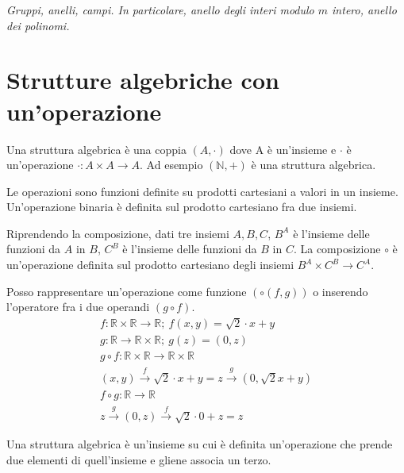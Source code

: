 
\begin{center}
\indent
\textit{Gruppi, anelli, campi. In particolare, anello degli interi modulo $m$ intero, anello dei polinomi.}
\end{center}

\section{Strutture algebriche con un'operazione}

Una struttura algebrica \`e una coppia $(A, \cdot)$ dove A \`e un'insieme e $\cdot$ \`e un'operazione $\cdot : A \times A \to A$. Ad esempio $(\mathbb{N}, +)$ \`e una struttura algebrica.

Le operazioni sono funzioni definite su prodotti cartesiani a valori in un insieme. Un'operazione binaria \`e definita sul prodotto cartesiano fra due insiemi.

Riprendendo la composizione, dati tre insiemi $A, B, C$, $B^A$ \`e l'insieme delle funzioni da $A$ in $B$, $C^B$ \`e l'insieme delle funzioni da $B$ in $C$. La composizione $\circ$ \`e un'operazione definita sul prodotto cartesiano degli insiemi $B^A \times C^B \to C^A$.

Posso rappresentare un'operazione come funzione $(\circ \left( f, g \right))$ o inserendo l'operatore fra i due operandi $ (g \circ f) $.
\begin{gather*}
f: \mathbb{R} \times \mathbb{R} \to \mathbb{R} ; \
f(x,y) = \sqrt{2} \cdot x + y \\
g: \mathbb{R} \to \mathbb{R} \times \mathbb{R} ; \
g(z) = (0,z) \\
g \circ f : \mathbb{R} \times \mathbb{R} \to \mathbb{R} \times \mathbb{R} \\
(x,y) \xrightarrow{f} \sqrt{2} \cdot x + y = z \xrightarrow{g} \left( 0, \sqrt{2}x + y \right) \\
f \circ g : \mathbb{R} \to \mathbb{R} \\
z \xrightarrow{g} (0,z) \xrightarrow{f} \sqrt{2} \cdot 0 + z = z
\end{gather*}

Una struttura algebrica \`e un'insieme su cui \`e definita un'operazione che prende due elementi di quell'insieme e gliene associa un terzo.

